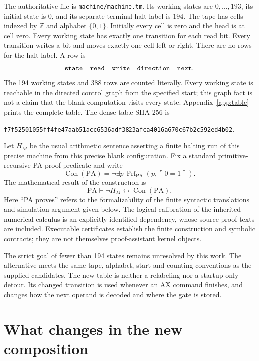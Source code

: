 \documentclass[11pt,letterpaper]{article}
\newcommand{\PA}{\mathrm{PA}}
\newcommand{\Con}{\operatorname{Con}}
\newcommand{\Prf}{\operatorname{Prf}}
\newcommand{\file}[1]{\texttt{\nolinkurl{#1}}}
\begin{document}
The authoritative file is \file{machine/machine.tm}. Its working states
are $0,\ldots,193$, its initial state is $0$, and its separate terminal halt
label is $194$. The tape has cells indexed by $\mathbb Z$ and alphabet
$\{0,1\}$. Initially every cell is zero and the head is at cell zero.
Every working state has exactly one transition for each read bit. Every
transition writes a bit and moves exactly one cell left or right.
There are no rows for the halt label. A row is
\[
\texttt{state\quad read\quad write\quad direction\quad next}.
\]
The 194 working states and 388 rows are counted literally. Every working
state is reachable in the directed control graph from the specified start;
this graph fact is not a claim that the blank computation visits every
state. Appendix~\ref{app:table} prints the complete table. The dense-table
SHA-256 is
\begin{center}\small
\nolinkurl{f7f52501055ff4fe47aab51acc6536adf3823afca4016a670c67b2c592ed4b02}.
\end{center}

Let $H_M$ be the usual arithmetic sentence asserting a finite halting run
of this precise machine from this precise blank configuration. Fix a
standard primitive-recursive PA proof predicate and write
\[
\Con(\PA)=\neg\exists p\,\Prf_{\PA}(p,\ulcorner 0=1\urcorner).
\]
The mathematical result of the construction is
\begin{equation}
\boxed{\quad\PA\vdash \neg H_M\leftrightarrow\Con(\PA).\quad}
\label{eq:main}
\end{equation}
Here ``PA proves'' refers to the formalizability of the finite syntactic
translations and simulation argument given below. The logical calibration
of the inherited numerical calculus is an explicitly identified dependency,
whose source proof texts are included. Executable certificates establish
the finite construction and symbolic contracts; they are not themselves
proof-assistant kernel objects.



The strict goal of fewer than 194 states remains unresolved by this work.
The alternative meets the same tape, alphabet, start and counting conventions
as the supplied candidates. The new table is neither a relabeling nor a
startup-only detour. Its changed transition is used whenever an AX command
finishes, and changes how the next operand is decoded and where the gate
is stored.



\section{What changes in the new composition}
\label{sec:construction}
\end{document}
